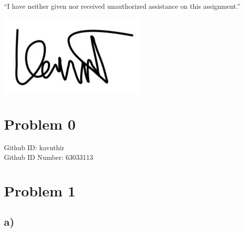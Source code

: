 \documentclass{article}
\begin{document}
\begin{center}
    “I have neither given nor received unauthorized assistance on this assignment.”
    
    \includegraphics[width = .1\textwidth]{Signature.jpg}
\end{center}
\section*{Problem 0}
\begin{center}
    Github ID: kavnthir\\
    Github ID Number: 63033113
\end{center} 
\section*{Problem 1}
\subsection*{a)}
\begin{center}
\end{center}
\newpage
\end{document}
